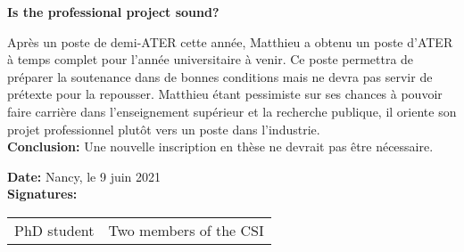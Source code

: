 \documentclass[12pt]{article}
\newcommand{\commentaire}[1]{\small\textit{#1}}
\begin{document}
\noindent\textbf{Is the professional project sound?}

Après un poste de demi-ATER cette année, Matthieu a obtenu un poste d'ATER à temps complet pour l'année universitaire à venir. Ce poste permettra de préparer la soutenance dans de bonnes conditions mais ne devra pas servir de prétexte pour la repousser. Matthieu étant pessimiste sur ses chances à pouvoir faire carrière dans l'enseignement supérieur et la recherche publique, il oriente son projet professionnel plutôt vers un poste dans l'industrie.
\\

\noindent\textbf{Conclusion:}
Une nouvelle inscription en thèse ne devrait pas être nécessaire.

\bigskip

\noindent\textbf{Date:}
Nancy, le 9 juin 2021
\\

\noindent\textbf{Signatures:}

\bigskip

\begin{tabular}{@{}p{5cm}p{12cm}}
  PhD student & Two members of the CSI
\end{tabular}
\end{document}
